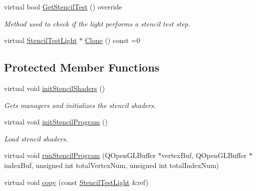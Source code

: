 \begin{DoxyCompactItemize}
virtual bool \mbox{\hyperlink{class_geometry_engine_1_1_geometry_world_item_1_1_geometry_light_1_1_stencil_test_light_ab25dbb6bfdeba423fcacfbae68effcdb}{Get\+Stencil\+Test}} () override
\begin{DoxyCompactList}\small\item\em Method used to check if the light performs a stencil test step. \end{DoxyCompactList}\item 
virtual \mbox{\hyperlink{class_geometry_engine_1_1_geometry_world_item_1_1_geometry_light_1_1_stencil_test_light}{Stencil\+Test\+Light}} $\ast$ \mbox{\hyperlink{class_geometry_engine_1_1_geometry_world_item_1_1_geometry_light_1_1_stencil_test_light_a6434a228dc64537ff9984c82eaf8ab07}{Clone}} () const =0
\end{DoxyCompactItemize}
\subsection*{Protected Member Functions}
\begin{DoxyCompactItemize}
\item 
\mbox{\label{class_geometry_engine_1_1_geometry_world_item_1_1_geometry_light_1_1_stencil_test_light_a15f8732a28984856a59ab5d416920897}} 
virtual void \mbox{\hyperlink{class_geometry_engine_1_1_geometry_world_item_1_1_geometry_light_1_1_stencil_test_light_a15f8732a28984856a59ab5d416920897}{init\+Stencil\+Shaders}} ()
\begin{DoxyCompactList}\small\item\em Gets managers and initializes the stencil shaders. \end{DoxyCompactList}\item 
\mbox{\label{class_geometry_engine_1_1_geometry_world_item_1_1_geometry_light_1_1_stencil_test_light_abf2cc5f924b94fd20dcfc36d4edad495}} 
virtual void \mbox{\hyperlink{class_geometry_engine_1_1_geometry_world_item_1_1_geometry_light_1_1_stencil_test_light_abf2cc5f924b94fd20dcfc36d4edad495}{init\+Stencil\+Program}} ()
\begin{DoxyCompactList}\small\item\em Load stencil shaders. \end{DoxyCompactList}\item 
virtual void \mbox{\hyperlink{class_geometry_engine_1_1_geometry_world_item_1_1_geometry_light_1_1_stencil_test_light_a619546f72b149132ea11a28796d307ff}{run\+Stencil\+Program}} (Q\+Open\+G\+L\+Buffer $\ast$vertex\+Buf, Q\+Open\+G\+L\+Buffer $\ast$index\+Buf, unsigned int total\+Vertex\+Num, unsigned int total\+Index\+Num)
\item 
virtual void \mbox{\hyperlink{class_geometry_engine_1_1_geometry_world_item_1_1_geometry_light_1_1_stencil_test_light_aa9a8a9c606ffbf686a951122b9b0fe65}{copy}} (const \mbox{\hyperlink{class_geometry_engine_1_1_geometry_world_item_1_1_geometry_light_1_1_stencil_test_light}{Stencil\+Test\+Light}} \&ref)
\end{DoxyCompactItemize}
